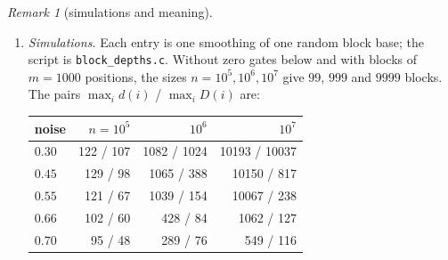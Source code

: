 \documentclass[11pt]{amsart}
\theoremstyle{definition}
\theoremstyle{remark}
\newtheorem{remark}[theorem]{Remark}
\begin{document}
\begin{remark}[simulations and meaning]\label{rem:block}
\begin{enumerate}[label=(\roman*),leftmargin=2.4em]
\item \emph{Simulations.} Each entry is one smoothing of one random block base; the script is
\texttt{block\_depths.c}. Without zero gates below and with blocks of $m=1000$ positions, the
sizes $n=10^5,10^6,10^7$ give $99$, $999$ and $9999$ blocks. The pairs $\max_id(i)$ /
$\max_iD(i)$ are:

\begin{center}
\begin{tabular}{lrrr}
\toprule
noise & $n=10^5$ & $10^6$ & $10^7$\\
\midrule
$0.30$ & 122 / 107 & 1082 / 1024 & 10193 / 10037\\
$0.45$ & 129 / 98 & 1065 / 388 & 10150 / 817\\
$0.55$ & 121 / 67 & 1039 / 154 & 10067 / 238\\
$0.66$ & 102 / 60 & 428 / 84 & 1062 / 127\\
$0.70$ & 95 / 48 & 289 / 76 & 549 / 116\\
\bottomrule
\end{tabular}
\end{center}


\end{enumerate}
\end{remark}
\end{document}
